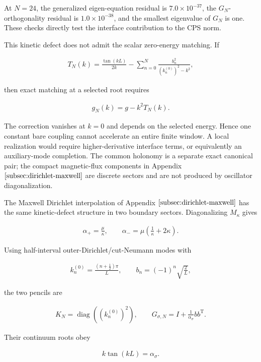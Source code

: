 At $N=24$, the generalized eigen-equation residual is $7.0\times10^{-37}$, the $G_N$-orthogonality residual is $1.0\times10^{-38}$, and the smallest eigenvalue of $G_N$ is one. These checks directly test the interface contribution to the CPS norm.

This kinetic defect does not admit the scalar zero-energy matching. If

\begin{align}
T_N(k)
=\frac{\tan(kL)}{2k}
-\sum_{n=0}^{N}\frac{b_n^2}{(k_n^{(0)})^2-k^2},
\end{align}

then exact matching at a selected root requires

\begin{align}
g_N(k)=g-k^2T_N(k).
\end{align}

The correction vanishes at $k=0$ and depends on the selected energy. Hence one constant bare coupling cannot accelerate an entire finite window. A local realization would require higher-derivative interface terms, or equivalently an auxiliary-mode completion. The common holonomy is a separate exact canonical pair; the compact magnetic-flux components in Appendix $\ref{subsec:dirichlet-maxwell}$ are discrete sectors and are not produced by oscillator diagonalization.

The Maxwell Dirichlet interpolation of Appendix $\ref{subsec:dirichlet-maxwell}$ has the same kinetic-defect structure in two boundary sectors. Diagonalizing $M_\kappa$ gives

\begin{align}
\alpha_+=\frac\mu\kappa,
\qquad
\alpha_-=\mu\left(\frac1\kappa+2\kappa\right).
\end{align}

Using half-interval outer-Dirichlet/cut-Neumann modes with

\begin{align}
k_n^{(0)}=\frac{(n+\frac12)\pi}{L},
\qquad
b_n=(-1)^n\sqrt{\frac2L},
\end{align}

the two pencils are

\begin{align}
K_N=\operatorname{diag}\!\left((k_n^{(0)})^2\right),
\qquad
G_{\sigma,N}=I+\frac1{\alpha_\sigma}bb^{\mathrm T}.
\end{align}

Their continuum roots obey

\begin{align}
k\tan(kL)=\alpha_\sigma.
\end{align}

